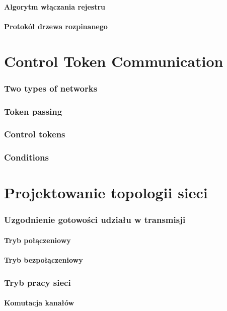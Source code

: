 \documentclass[a4paper,twoside]{article}
\begin{document}
	\subsection{Algorytm włączania rejestru}
	\subsection{Protokół drzewa rozpinanego}
	
	
\part{Control Token Communication}
\section{Two types of networks}
\section{Token passing}
\section{Control tokens}
\section{Conditions}


\part{Projektowanie topologii sieci}
\section{Uzgodnienie gotowości udziału w transmisji}
	\subsection{Tryb połączeniowy}
	\subsection{Tryb bezpołączeniowy}
\section{Tryb pracy sieci}
	\subsection{Komutacja kanałów}
\end{document}
